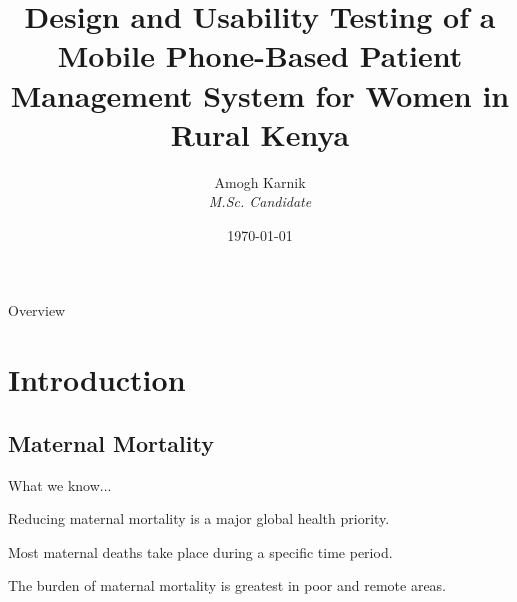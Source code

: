 \documentclass[xcolor=x11names,compress]{beamer}
\renewcommand{\(}{\begin{columns}}
\renewcommand{\)}{\end{columns}}
\newcommand{\<}[1]{\begin{column}{#1}}
\renewcommand{\>}{\end{column}}
\begin{document}
\title{Design and Usability Testing of a Mobile Phone-Based Patient Management System for Women in Rural Kenya}
\author[Amogh Karnik]{
	Amogh Karnik\\
	{\it M.Sc. Candidate}\\
}
\date{\today}

\begin{frame}
\titlepage
\end{frame}

\begin{frame}{Overview}
\tableofcontents
\end{frame}


\section{Introduction}
\subsection{Maternal Mortality}

\begin{frame}{What we know...}

\begin{block}{
Reducing maternal mortality is a major global health priority. }
\end{block}
\begin{block}{
Most maternal deaths take place during a specific time period.}
\end{block}
\begin{block}{
The burden of maternal mortality is greatest in poor and remote areas.}
\end{block}
\end{frame}
\end{document}
